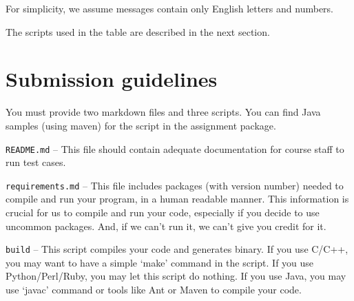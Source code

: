 \documentclass[11pt]{article}
\begin{document}
	For simplicity, we assume messages contain only English letters and	numbers. 
	
	The scripts used in the table are described in the next section.
	
	\section{Submission guidelines}
	\begin{compactitem}
		\item You must provide two markdown files and three scripts. You can find Java samples (using maven) for the script in the assignment package.
		\begin{compactitem}
			\item \texttt{README.md} -- This file should contain adequate documentation for course staff to run test cases.
			
			\item \texttt{requirements.md} -- This file includes packages (with version	number) needed to compile and run your program, in a human readable manner. This information is crucial for us to compile and run your code, especially if you decide to use uncommon packages. And, if we can't run it, we can't give you credit for it.
			\item \texttt{build} -- This script compiles your code and generates binary. If you use C/C++, you may want to have a simple `make' command in the script. If you use Python/Perl/Ruby, you may let this script do nothing. If you use Java, you may use `javac' command or tools like Ant or Maven to compile your code.
			

\end{compactitem}
\end{compactitem}
\end{document}
